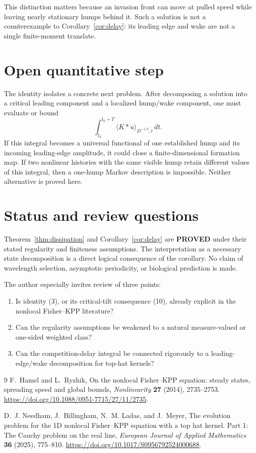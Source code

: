 \documentclass[11pt]{article}
\begin{document}
This distinction matters because an invasion front can move at pulled speed
while leaving nearly stationary humps behind it.  Such a solution is not a
counterexample to Corollary~\ref{cor:delay}: its leading edge and wake are not
a single finite-moment translate.

\section{Open quantitative step}

The identity isolates a concrete next problem.  After decomposing a solution
into a critical leading component and a localized hump/wake component, one
must evaluate or bound
\[
 \int_{t_0}^{t_0+T}\langle K*u\rangle_{D^{-1/2},t}\,dt.
\]
If this integral becomes a universal functional of one established hump and
its incoming leading-edge amplitude, it could close a finite-dimensional
formation map.  If two nonlinear histories with the same visible hump retain
different values of this integral, then a one-hump Markov description is
impossible.  Neither alternative is proved here.

\section{Status and review questions}

Theorem~\ref{thm:dissipation} and Corollary~\ref{cor:delay} are
\textbf{PROVED} under their stated regularity and finiteness assumptions.
The interpretation as a necessary state decomposition is a direct logical
consequence of the corollary.  No claim of wavelength selection, asymptotic
periodicity, or biological prediction is made.

The author especially invites review of three points:
\begin{enumerate}
  \item Is identity (3), or its critical-tilt consequence (10), already
        explicit in the nonlocal Fisher--KPP literature?
  \item Can the regularity assumptions be weakened to a natural
        measure-valued or one-sided weighted class?
  \item Can the competition-delay integral be connected rigorously to a
        leading-edge/wake decomposition for top-hat kernels?
\end{enumerate}

\begin{thebibliography}{9}
F.~Hamel and L.~Ryzhik,
\newblock On the nonlocal Fisher--KPP equation: steady states, spreading
speed and global bounds,
\newblock \emph{Nonlinearity} \textbf{27} (2014), 2735--2753.
\newblock \url{https://doi.org/10.1088/0951-7715/27/11/2735}.

D.~J. Needham, J.~Billingham, N.~M. Ladas, and J.~Meyer,
\newblock The evolution problem for the 1D nonlocal Fisher--KPP equation
with a top hat kernel. Part 1: The Cauchy problem on the real line,
\newblock \emph{European Journal of Applied Mathematics} \textbf{36}
(2025), 775--810.
\newblock \url{https://doi.org/10.1017/S0956792524000688}.
\end{thebibliography}
\end{document}
